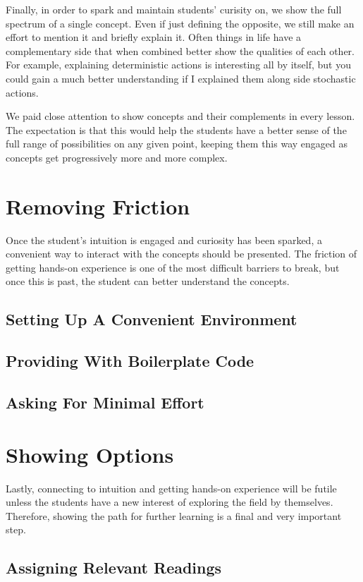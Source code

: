 \documentclass[11pt]{article} %
\begin{document}
Finally, in order to spark and maintain students' curisity on, we show the
full spectrum of a single concept. Even if just defining the opposite, we
still make an effort to mention it and briefly explain it. Often things in
life have a complementary side that when combined better show the qualities
of each other. For example, explaining deterministic actions is interesting
all by itself, but you could gain a much better understanding if I explained
them along side stochastic actions.

We paid close attention to show concepts and their complements in every
lesson. The expectation is that this would help the students have a better
sense of the full range of possibilities on any given point, keeping them
this way engaged as concepts get progressively more and more complex.

\section{Removing Friction}

Once the student's intuition is engaged and curiosity has been sparked, a
convenient way to interact with the concepts should be presented. The
friction of getting hands-on experience is one of the most difficult
barriers to break, but once this is past, the student can better
understand the concepts.

\subsection{Setting Up A Convenient Environment}
\subsection{Providing With Boilerplate Code}
\subsection{Asking For Minimal Effort}

\section{Showing Options}
Lastly, connecting to intuition and getting hands-on experience will be
futile unless the students have a new interest of exploring the field by
themselves. Therefore, showing the path for further learning is a final
and very important step.

\subsection{Assigning Relevant Readings}
\end{document}
